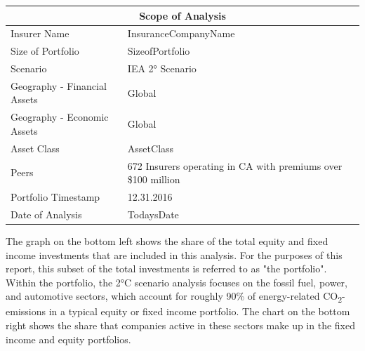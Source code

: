 \documentclass[10pt,table,a4]{article}\usepackage[]{graphicx}\usepackage[]{color}
\begin{document}
\begin{multicols}{2}
		
		\begin{center}
			{
				\setlength{\tabcolsep}{10pt} %
				\renewcommand{\arraystretch}{1.5} %
				\begin{tabular}{ p{.35\linewidth} p{.49\linewidth} }
					\hline
					\multicolumn{2}{c}{\textbf{Scope of Analysis}} \\
					\hline
					Insurer Name & InsuranceCompanyName \\ 
					Size of Portfolio & SizeofPortfolio \\ 
					Scenario & IEA 2° Scenario \\ 
					Geography - \newline Financial Assets & Global \\ 
					Geography - \newline Economic Assets & Global \\ 
					Asset Class & AssetClass \\ 
					Peers & 672 Insurers operating in CA with premiums over \$100 million \\
					Portfolio Timestamp & 12.31.2016 \\ 
					Date of Analysis & TodaysDate \\ 
					\hline
				\end{tabular}
			}
			
		\end{center}
		
		
		
		The graph on the bottom left shows the share of the total equity and fixed income investments that are included in this analysis. For the purposes of this report, this subset of the total investments is referred to as "the portfolio".  Within the portfolio, the 2°C scenario analysis focuses on the fossil fuel, power, and automotive sectors, which 	account for roughly 90\% of energy-related CO\textsubscript{2}-emissions in a typical equity or fixed income portfolio. The chart on the bottom right shows the share that companies active in these sectors make up in the fixed income and equity portfolios.
		
		
		
		
		
		
		
		\vspace{1.2cm}
		
		
	\end{multicols}	
	
	
	
\end{document}
